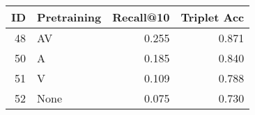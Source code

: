 \begin{tabular}{rlrr}
\toprule
 ID & Pretraining &  Recall@10 &  Triplet Acc \\
\midrule
 48 &          AV &      0.255 &        0.871 \\
 50 &           A &      0.185 &        0.840 \\
 51 &           V &      0.109 &        0.788 \\
 52 &        None &      0.075 &        0.730 \\
\bottomrule
\end{tabular}
